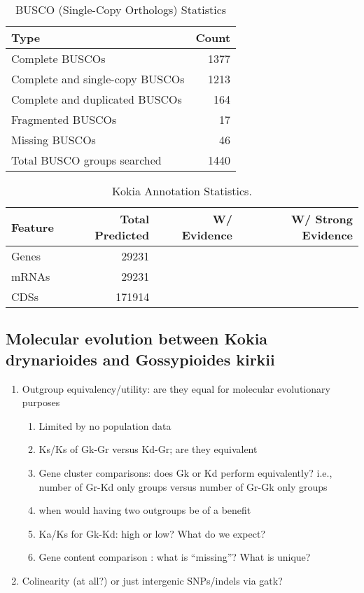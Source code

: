 \documentclass[10pt,letterpaper]{article}
\begin{document}
\begin{table}[ht]
  \begin{center}
    \caption{BUSCO (Single-Copy Orthologs) Statistics}
    \begin{tabular}{lr}
      \toprule
      Type & Count\\
      \midrule
      Complete BUSCOs & 1377\\
      Complete and single-copy BUSCOs & 1213\\
      Complete and duplicated BUSCOs & 164\\
      Fragmented BUSCOs & 17\\
      Missing BUSCOs & 46\\
      Total BUSCO groups searched & 1440\\
      \bottomrule
    \end{tabular}
  \end{center}
\end{table}

\begin{table}[ht]
  \begin{center}
    \caption{Kokia Annotation Statistics.}
    \begin{tabular}{l*{3}{r}}
      \toprule
      Feature & Total Predicted & W/ Evidence  & W/ Strong Evidence\\
      \midrule
      Genes &  29231 & & \\
      mRNAs & 29231 &  & \\
      CDSs & 171914 &  & \\
      \bottomrule
    \end{tabular}
  \end{center}
\end{table}

\subsection*{Molecular evolution between Kokia drynarioides and Gossypioides
  kirkii}

\begin{enumerate}
\item Outgroup equivalency/utility: are they equal for molecular evolutionary purposes
  \begin{enumerate}
  \item Limited by no population data
  \item Ks/Ks of Gk-Gr versus Kd-Gr; are they equivalent
  \item Gene cluster comparisons: does Gk or Kd perform equivalently? i.e.,
    number of Gr-Kd only groups versus number of Gr-Gk only groups
  \item when would having two outgroups be of a benefit
  \item Ka/Ks for Gk-Kd: high or low? What do we expect?
  \item Gene content comparison : what is “missing”? What is unique?
  \end{enumerate}
\item Colinearity (at all?) or just intergenic SNPs/indels via gatk?
\end{enumerate}
\end{document}
